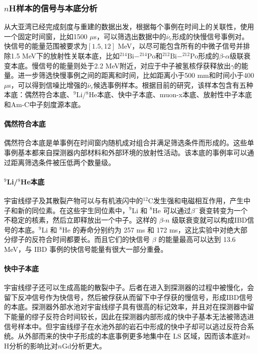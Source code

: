 \documentclass[a4paper,zihao=-4]{article}
\begin{document}
\subsubsection{$n$H样本的信号与本底分析}\label{sec:backgrounds}
从大亚湾已经完成刻度与重建的数据出发，根据每个事例在时间上的关联性，使用一个固定时间窗，比如1500 $\mu$s，可以筛选出数据中的$\overline{\nu}_e$形成的快慢信号事例对。快信号的能量范围被要求为$[1.5, 12]$ MeV，以尽可能包含所有的中微子信号并排除1.5 MeV下的放射性关联本底，比如$^{214}\text{Bi}-^{214}\text{Po}$和$^{212}\text{Bi}-^{212}\text{Po}$形成的$\beta$-$\alpha$级联衰变本底。慢信号的能量则处于2.2 MeV附近，对应于中子被氢核俘获释放出$\gamma$的能量。进一步筛选快慢事例之间的距离和时间，比如距离小于500 mm和时间小于400 $\mu$s，可以得到信噪比增强的$\overline{\nu}_e$候选事例样本。根据目前的研究，该样本包含有五种本底：偶然符合本底、$^9$Li/$^8$He本底、快中子本底、muon-x本底、放射性中子本底和Am-C中子刻度源本底。

\paragraph{偶然符合本底}

偶然符合本底是单事例在时间窗内随机成对组合并满足筛选条件而形成的。这些单事例基本都来自探测器内部材料和外部环境的放射性活动。该本底的事例率可以通过距离筛选条件被压低两个数量级。

\paragraph{$^9$Li/$^8$He本底}宇宙线缪子及其散裂产物可以与有机液闪中的$^{12}$C发生强和电磁相互作用，产生中子和新的同位素。在这些宇生同位素中，$^9$Li 和 $^8$He 可以通过$\beta^-$衰变转变为一个不稳定的核素，然后立即释放出一个中子。这样的 $\beta$-$n$ 级联衰变就可以构成IBD信号的本底。$^9$Li 和 $^8$He 的寿命分别约为 257 ms 和 172 ms，这比实验中对绝大部分缪子的反符合时间都要长。而且它们的快信号 $\beta$ 的能量最高可以达到 13.6 MeV，与 IBD 事例的快信号能量有很大一部分重叠。
\paragraph{快中子本底}宇宙线缪子还可以生成高能的散裂中子。后者在进入到探测器的过程中被慢化，会留下反冲信号作为快信号，然后被俘获从而留下中子俘获的慢信号，形成IBD信号的本底。探测器外部水池对宇宙线缪子具有很高的标记效率，并且对在探测器中留下能量的缪子反符合时间较长，因此在探测器内部形成的快中子基本无法被筛选进信号样本中。但宇宙线缪子在水池外部的岩石中形成的快中子却可以逃过反符合系统。从外部而来的快中子形成的本底事例更多地集中在 LS 区域，因而该本底对$n$H分析的影响比对$n$Gd分析更大。
\end{document}
